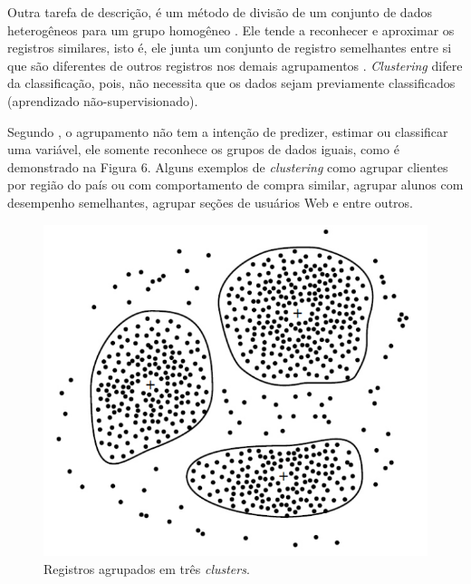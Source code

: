 \par
Outra tarefa de descrição, é um método de divisão de um conjunto de dados heterogêneos para um grupo homogêneo \cite{LeandroSilva2014}. Ele tende a reconhecer e aproximar os registros similares, isto é, ele junta um conjunto de registro semelhantes entre si que são diferentes de outros registros nos demais agrupamentos \cite{Camilo2009}. \textit{Clustering} difere da classificação, pois, não necessita que os dados sejam previamente classificados (aprendizado não-supervisionado).

\par
Segundo \cite{Camilo2009}, o agrupamento não tem a intenção de predizer, estimar ou classificar uma variável, ele somente reconhece os grupos de dados iguais, como é demonstrado na Figura 6. Alguns exemplos de \textit{clustering} como agrupar clientes por região do país ou com comportamento de compra similar, agrupar alunos com desempenho semelhantes, agrupar seções de usuários Web e entre outros.


\begin{figure}[!htp]
	\begin{center}
    \caption{\label{fig:waveform_fig} Registros agrupados em três \textit{clusters}.}
	\includegraphics[scale=0.50]{Figuras/Agrupamento.png}
	\end{center}
\end{figure}



